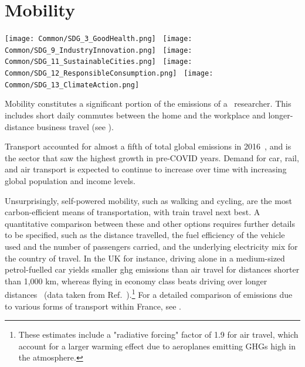 \documentclass[../SustainableHEP.tex]{subfiles}
\begin{document}
\RaggedRight
\sloppy
\newpage


\section{Mobility}
\label{sec:Travel}


\begin{center}
\texttt{[image: Common/SDG\_3\_GoodHealth.png]}~%
\texttt{[image: Common/SDG\_9\_IndustryInnovation.png]}~%
\texttt{[image: Common/SDG\_11\_SustainableCities.png]}~%
\texttt{[image: Common/SDG\_12\_ResponsibleConsumption.png]}~%
\texttt{[image: Common/SDG\_13\_ClimateAction.png]}
\end{center}


\exSum

\noindent Mobility constitutes a significant portion of the emissions of a \ACR\ researcher.  This includes short daily commutes between the home and the workplace and longer-distance business travel (see ).

Transport accounted for almost a fifth of total global emissions in 2016~\cite{OWIDsector}, and is the sector that saw the highest growth in pre-COVID years.  Demand for car, rail, and air transport is expected to continue to increase over time with increasing global population and income levels.

Unsurprisingly, self-powered mobility, such as walking and cycling, are the most carbon-efficient means of transportation, with train travel next best.  A quantitative comparison between these and other options requires further details to be specified, such as the distance travelled, the fuel efficiency of the vehicle used and the number of passengers carried, and the underlying electricity mix for the country of travel.  In the UK for instance, driving alone in a medium-sized petrol-fuelled car yields smaller \acrshort{ghg} emissions than air travel for distances shorter than 1,000 km, whereas flying in economy class beats driving over longer distances~\cite{OWIDtravel} (data taken from Ref.~\cite{BEIS}).\footnote{These estimates include a "radiative forcing" factor of 1.9 for air travel, which account for a larger warming effect due to aeroplanes emitting GHGs high in the atmosphere.} 
For a detailed comparison of emissions due to various forms of transport within France, see .
\end{document}
